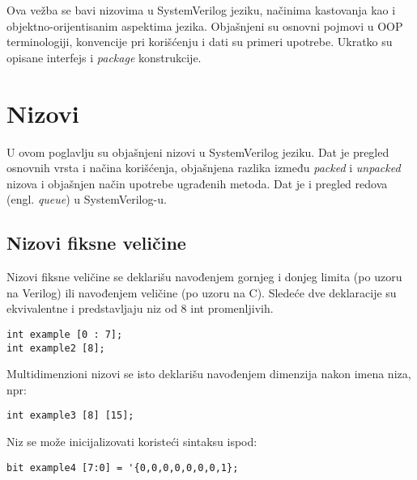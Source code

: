 %
% 

Ova vežba se bavi nizovima u SystemVerilog jeziku, načinima kastovanja kao i
objektno-orijentisanim aspektima jezika. Objašnjeni su osnovni pojmovi u OOP
terminologiji, konvencije pri korišćenju i dati su primeri upotrebe. Ukratko su
opisane interfejs i \emph{package} konstrukcije.


\section{Nizovi}

U ovom poglavlju su objašnjeni nizovi u SystemVerilog jeziku. Dat je pregled
osnovnih vrsta i načina korišćenja, objašnjena razlika između \emph{packed} i
\emph{unpacked} nizova i objašnjen način upotrebe ugrađenih metoda. Dat je i
pregled redova (engl. \emph{queue}) u SystemVerilog-u.


\subsection{Nizovi fiksne veličine}

Nizovi fiksne veličine se deklarišu navođenjem gornjeg i donjeg limita (po uzoru
na Verilog) ili navođenjem veličine (po uzoru na C). Sledeće dve deklaracije su
ekvivalentne i predstavljaju niz od 8 int promenljivih.

\begin{lstlisting}
int example [0 : 7];
int example2 [8];
\end{lstlisting}

Multidimenzioni nizovi se isto deklarišu navođenjem dimenzija nakon imena niza, npr:

\begin{lstlisting}
int example3 [8] [15];
\end{lstlisting}

Niz se može inicijalizovati koristeći sintaksu ispod:

\begin{lstlisting}
bit example4 [7:0] = '{0,0,0,0,0,0,0,1};
\end{lstlisting}

